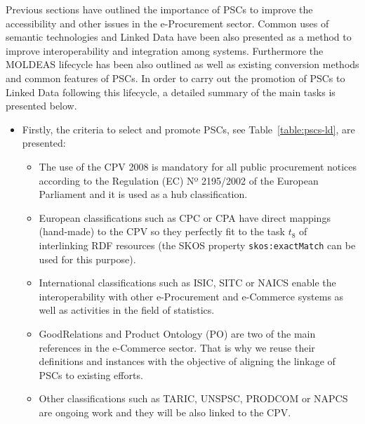 Previous sections have outlined the importance of PSCs to improve the accessibility and other issues in 
the e-Procurement sector. Common uses of semantic technologies and Linked Data have been also presented 
as a method to improve interoperability and integration among systems. Furthermore the MOLDEAS lifecycle has been 
also outlined as well as existing conversion methods and common features of PSCs. In order to carry out 
the promotion of PSCs to Linked Data following this lifecycle, a detailed summary of the main tasks is presented below.

\begin{itemize}
 \item  Firstly, the criteria to select and promote PSCs, see Table~\ref{table:pscs-ld}, are presented:
\begin{itemize}
 \item The use of the CPV 2008 is mandatory for all public procurement notices according 
 to the Regulation (EC) Nº 2195/2002 of the European Parliament and it is used as a hub classification.
 \item European classifications such as CPC or CPA have direct mappings (hand-made) to the CPV so they perfectly fit 
 to the task $t_8$ of interlinking RDF resources (the SKOS property \texttt{skos:exactMatch} can be used for this purpose).
 \item International classifications such as ISIC, SITC or NAICS enable the interoperability with 
 other e-Procurement and e-Commerce systems as well as activities in the field of statistics.
 \item GoodRelations and Product Ontology (PO) are two of the main references in the e-Commerce sector. 
 That is why we reuse their definitions and instances with the objective of aligning the linkage of PSCs to existing efforts. 
 \item Other classifications such as TARIC, UNSPSC, PRODCOM or NAPCS are ongoing work and they will be also linked to the CPV.
\end{itemize}


\end{itemize}

